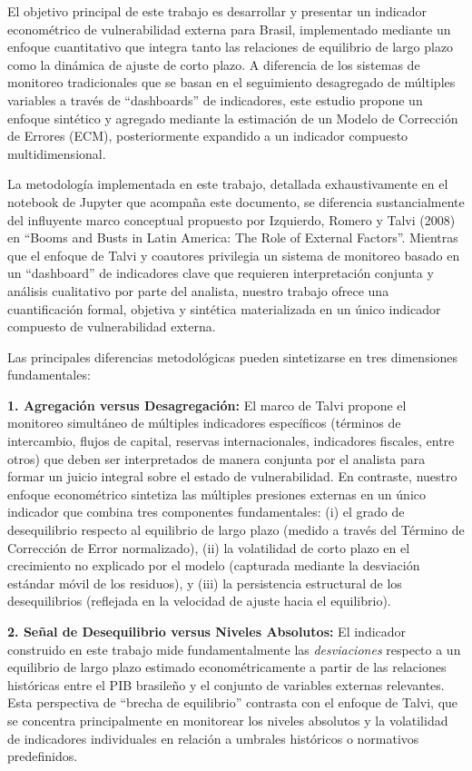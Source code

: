 \documentclass[3p,11pt]{elsarticle}
\begin{document}
El objetivo principal de este trabajo es desarrollar y presentar un indicador econométrico de vulnerabilidad externa para Brasil, implementado mediante un enfoque cuantitativo que integra tanto las relaciones de equilibrio de largo plazo como la dinámica de ajuste de corto plazo. A diferencia de los sistemas de monitoreo tradicionales que se basan en el seguimiento desagregado de múltiples variables a través de ``dashboards'' de indicadores, este estudio propone un enfoque sintético y agregado mediante la estimación de un Modelo de Corrección de Errores (ECM), posteriormente expandido a un indicador compuesto multidimensional.

La metodología implementada en este trabajo, detallada exhaustivamente en el notebook de Jupyter que acompaña este documento, se diferencia sustancialmente del influyente marco conceptual propuesto por Izquierdo, Romero y Talvi (2008) en ``Booms and Busts in Latin America: The Role of External Factors''. Mientras que el enfoque de Talvi y coautores privilegia un sistema de monitoreo basado en un ``dashboard'' de indicadores clave que requieren interpretación conjunta y análisis cualitativo por parte del analista, nuestro trabajo ofrece una cuantificación formal, objetiva y sintética materializada en un único indicador compuesto de vulnerabilidad externa.

Las principales diferencias metodológicas pueden sintetizarse en tres dimensiones fundamentales:

\textbf{1. Agregación versus Desagregación:} El marco de Talvi propone el monitoreo simultáneo de múltiples indicadores específicos (términos de intercambio, flujos de capital, reservas internacionales, indicadores fiscales, entre otros) que deben ser interpretados de manera conjunta por el analista para formar un juicio integral sobre el estado de vulnerabilidad. En contraste, nuestro enfoque econométrico sintetiza las múltiples presiones externas en un único indicador que combina tres componentes fundamentales: (i) el grado de desequilibrio respecto al equilibrio de largo plazo (medido a través del Término de Corrección de Error normalizado), (ii) la volatilidad de corto plazo en el crecimiento no explicado por el modelo (capturada mediante la desviación estándar móvil de los residuos), y (iii) la persistencia estructural de los desequilibrios (reflejada en la velocidad de ajuste hacia el equilibrio).

\textbf{2. Señal de Desequilibrio versus Niveles Absolutos:} El indicador construido en este trabajo mide fundamentalmente las \textit{desviaciones} respecto a un equilibrio de largo plazo estimado econométricamente a partir de las relaciones históricas entre el PIB brasileño y el conjunto de variables externas relevantes. Esta perspectiva de ``brecha de equilibrio'' contrasta con el enfoque de Talvi, que se concentra principalmente en monitorear los niveles absolutos y la volatilidad de indicadores individuales en relación a umbrales históricos o normativos predefinidos.
\end{document}
